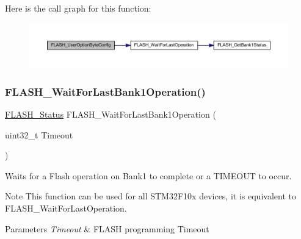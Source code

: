 Here is the call graph for this function\+:
\nopagebreak
\begin{figure}[H]
\begin{center}
\leavevmode
\includegraphics[width=350pt]{group___f_l_a_s_h___exported___functions_gaae1c493bb06c930ceb84dedfdb7325f6_cgraph}
\end{center}
\end{figure}
\mbox{\label{group___f_l_a_s_h___exported___functions_ga470d345c2ea4304f899aa988bdd23824}} 
\subsubsection{\texorpdfstring{F\+L\+A\+S\+H\+\_\+\+Wait\+For\+Last\+Bank1\+Operation()}{FLASH\_WaitForLastBank1Operation()}}
{\footnotesize\ttfamily \hyperlink{group___f_l_a_s_h___exported___types_gadc63a6f3404ff1f71229a66915e9cdc0}{F\+L\+A\+S\+H\+\_\+\+Status} F\+L\+A\+S\+H\+\_\+\+Wait\+For\+Last\+Bank1\+Operation (\begin{DoxyParamCaption}\item[{uint32\+\_\+t}]{Timeout }\end{DoxyParamCaption})}



Waits for a Flash operation on Bank1 to complete or a T\+I\+M\+E\+O\+UT to occur. 

\begin{DoxyNote}{Note}
This function can be used for all S\+T\+M32\+F10x devices, it is equivalent to F\+L\+A\+S\+H\+\_\+\+Wait\+For\+Last\+Operation. 
\end{DoxyNote}

\begin{DoxyParams}{Parameters}
{\em Timeout} & F\+L\+A\+SH programming Timeout \\
\hline
\end{DoxyParams}

